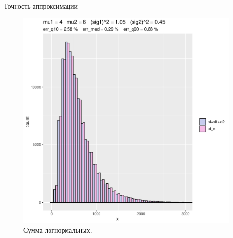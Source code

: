 \documentclass[ucs, notheorems, handout]{beamer}
\begin{document}
\begin{frame}{Точность аппроксимации }
	
	\begin{figure}[h]
		\begin{center}
			\begin{minipage}[h]{0.8\linewidth}
				\includegraphics[width=1\linewidth]{hist_new_4.pdf}
				\caption{Сумма логнормальных.} %
				\label{ris7} %
			\end{minipage}
			
		\end{center}
	\end{figure}	
	
\end{frame}
\end{document}

